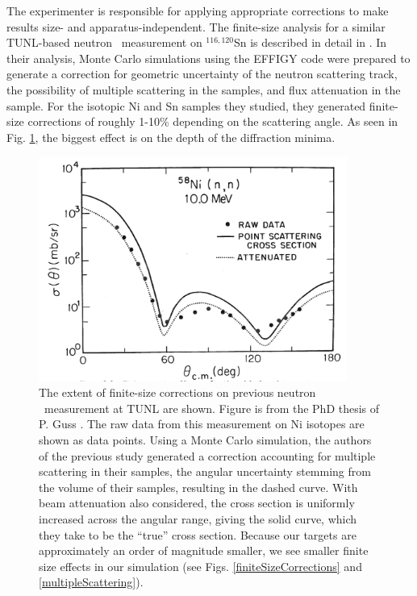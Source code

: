The experimenter is responsible
for applying appropriate corrections to make results size- and
apparatus-independent. The finite-size analysis for
a similar TUNL-based neutron \el\ measurement on $^{116,120}$Sn is described in detail
in \cite{GussPhDThesis}. In their analysis, Monte Carlo simulations using the
EFFIGY code were
prepared to generate a correction for geometric uncertainty of the neutron
scattering track, the possibility of multiple scattering
in the samples, and flux attenuation in the sample.
For the isotopic Ni and Sn samples they studied, they generated finite-size
corrections of roughly 1-10\% depending on the scattering angle. As seen in
Fig. \ref{GussFiniteSizeEffect}, the
biggest effect is on the depth of the diffraction minima.
\begin{figure}[ht!]
    \centering
    \includegraphics[width=0.9\textwidth, trim={0 0.1cm 0 0}, clip]{figures/GussFiniteSizeEffect.png}
    \caption[Effect of finite-size corrections on previous neutron \el\ measurement at
    TUNL]
    {
        The extent of finite-size corrections on previous neutron \el\ measurement at
        TUNL are shown. Figure is from the PhD thesis of P. Guss \cite{GussPhDThesis}.
        The raw data from this measurement on Ni isotopes are shown as data
        points. Using a Monte Carlo simulation, the authors of the previous
        study generated a correction accounting for multiple scattering in
        their samples, the angular uncertainty stemming from the volume
        of their samples, resulting in the dashed curve. With beam
        attenuation also considered, the cross section is uniformly
        increased across the angular range, giving the solid curve, which
        they take to be the ``true'' cross section. Because our targets are
        approximately an order of magnitude smaller, we see smaller
        finite size effects in our simulation (see Figs.
        \ref{finiteSizeCorrections} and \ref{multipleScattering}).
    }
    \label{GussFiniteSizeEffect}
\end{figure}
